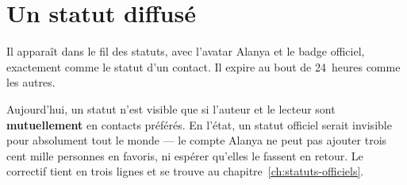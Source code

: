 \section{Un statut diffusé}

Il apparaît dans le fil des statuts, avec l'avatar Alanya et le badge officiel, exactement
comme le statut d'un contact. Il expire au bout de 24~heures comme les autres.

\begin{alerte}
Aujourd'hui, un statut n'est visible que si l'auteur et le lecteur sont \textbf{mutuellement}
en contacts préférés. En l'état, un statut officiel serait invisible pour absolument tout le
monde --- le compte Alanya ne peut pas ajouter trois cent mille personnes en favoris, ni
espérer qu'elles le fassent en retour. Le correctif tient en trois lignes et se trouve au
chapitre~\ref{ch:statuts-officiels}.
\end{alerte}
